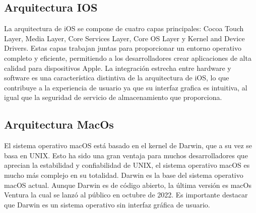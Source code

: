 \documentclass[11pt,twoside]{book}
\begin{document}
\subsection{Arquitectura IOS}
La arquitectura de iOS se compone de cuatro capas principales: Cocoa Touch Layer, Media Layer, Core Services Layer, Core OS Layer y Kernel and Device Drivers. Estas capas trabajan juntas para proporcionar un entorno operativo completo y eficiente, permitiendo a los desarrolladores crear aplicaciones de alta calidad para dispositivos Apple. La integración estrecha entre hardware y software es una característica distintiva de la arquitectura de iOS, lo que contribuye a la experiencia de usuario ya que su interfaz grafica es intuitiva, al igual que la seguridad de servicio de almacenamiento que proporciona. 

\subsection{Arquitectura MacOs}
El sistema operativo macOS está basado en el kernel de Darwin, que a su vez se basa en UNIX. Esto ha sido una gran ventaja para muchos desarrolladores que aprecian la estabilidad y confiabilidad de UNIX, el sistema operativo macOS es mucho más complejo en su totalidad. Darwin es la base del sistema operativo macOS actual. Aunque Darwin es de código abierto, la última versión es macOs Ventura la cual se lanzó al público en octubre de 2022. Es importante destacar que Darwin es un sistema operativo sin interfaz gráfica de usuario.

\vspace{5pt}

\newpage
\end{document}

